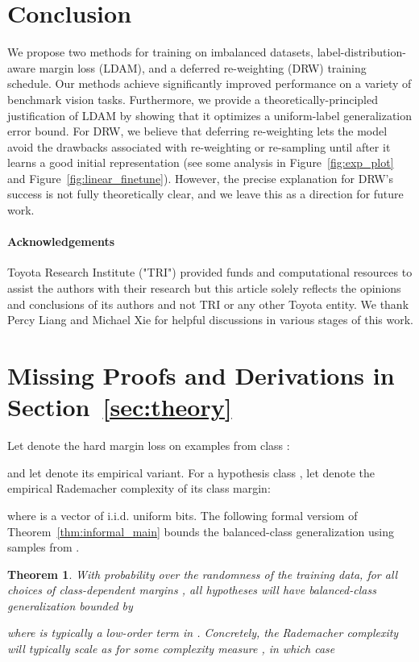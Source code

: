 \documentclass{article}
\newtheorem{theorem}{Theorem}
\begin{document}
\section{Conclusion}

We propose two methods for training on imbalanced datasets, label-distribution-aware margin loss (LDAM), and a deferred re-weighting (DRW) training schedule. Our methods achieve significantly improved performance on a variety of benchmark vision tasks. Furthermore, we provide a theoretically-principled justification of LDAM by showing that it optimizes a uniform-label generalization error bound. For DRW, we believe that deferring re-weighting lets the model avoid the drawbacks associated with re-weighting or re-sampling until after it learns a good initial representation (see some analysis in Figure~\ref{fig:exp_plot} and Figure~\ref{fig:linear_finetune}). However, the precise explanation for DRW's success is not fully theoretically clear, and we leave this as a direction for future work. 

\paragraph{Acknowledgements}

Toyota Research Institute ("TRI") provided funds and computational resources to assist the authors with their research but this article solely reflects the opinions and conclusions of its authors and not TRI or any other Toyota entity. We  thank Percy Liang and Michael Xie for helpful discussions in various stages of this work.

\medskip

{\small

}

\newpage
\appendix
\section{Missing Proofs and Derivations in Section~\ref{sec:theory}}
\label{sec:missing_theory}
\newcommand{\mrad}{\mathfrak{R}}
\newcommand{\X}{\mathcal{X}}
Let  denote the hard margin loss on examples from class :

and let  denote its empirical variant. For a hypothesis class , let  denote the empirical Rademacher complexity of its class  margin: 

where  is a vector of i.i.d. uniform  bits. The following formal versiom of Theorem~\ref{thm:informal_main} bounds the balanced-class generalization  using samples from .
\begin{theorem}\label{thm:technical_main}
	With probability  over the randomness of the training data, for all choices of class-dependent margins , all hypotheses  will have balanced-class generalization bounded by 
	
	where  is typically a low-order term in . Concretely, the Rademacher complexity  will typically scale as  for some complexity measure , in which case 
	
\end{theorem}
\end{document}
